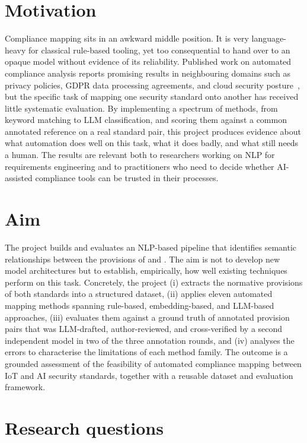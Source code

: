 \section{Motivation}\label{sec:motivation}

Compliance mapping sits in an awkward middle position. It is very language-heavy
for classical rule-based tooling, yet too consequential to hand over to an
opaque model without evidence of its reliability. Published work on automated
compliance analysis reports promising results in neighbouring domains such as
privacy policies, GDPR data processing agreements, and cloud security
posture~\cite{rodriguez2024llm,cejas2023gdpr,barhaim2023cloud}, but the
specific task of mapping one security standard onto another has received little
systematic evaluation. By implementing a spectrum of methods, from keyword
matching to LLM classification, and scoring them against a common annotated
reference on a real standard pair, this project produces evidence about what
automation does well on this task, what it does badly, and what still needs a
human. The results are relevant both to researchers working on NLP for
requirements engineering and to practitioners who need to decide whether
AI-assisted compliance tools can be trusted in their processes.

\section{Aim}\label{sec:aim}

The project builds and evaluates an NLP-based pipeline that identifies semantic
relationships between the provisions of \standardA{} and \standardB{}. The aim
is not to develop new model architectures but to establish, empirically, how
well existing techniques perform on this task. Concretely, the project (i)
extracts the normative provisions of both standards into a structured dataset,
(ii) applies eleven automated mapping methods spanning rule-based, embedding-based,
and LLM-based approaches, (iii) evaluates them against a ground truth of annotated provision pairs that was
LLM-drafted, author-reviewed, and cross-verified by a second independent model in two of the three annotation rounds, and (iv) analyses the errors to
characterise the limitations of each method family. The outcome is a grounded
assessment of the feasibility of automated compliance mapping between IoT and
AI security standards, together with a reusable dataset and evaluation
framework.

\section{Research questions}\label{sec:rqs}

